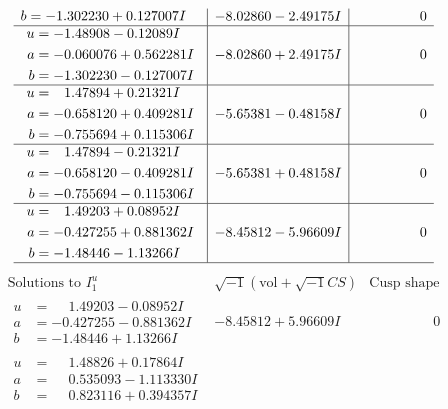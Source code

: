 \documentclass[1p]{elsarticle_modified}
\theoremstyle{definition}
\newcommand{\I}{\sqrt{-1}}
\begin{document}
$$\begin{array}{c|c|c}
\begin{aligned}
b &= -1.302230 + 0.127007 I\end{aligned}
 & -8.02860 - 2.49175 I & \phantom{-0.000000 } 0 \\ \hline\begin{aligned}
u &= -1.48908 - 0.12089 I \\
a &= -0.060076 + 0.562281 I \\
b &= -1.302230 - 0.127007 I\end{aligned}
 & -8.02860 + 2.49175 I & \phantom{-0.000000 } 0 \\ \hline\begin{aligned}
u &= \phantom{-}1.47894 + 0.21321 I \\
a &= -0.658120 + 0.409281 I \\
b &= -0.755694 + 0.115306 I\end{aligned}
 & -5.65381 - 0.48158 I & \phantom{-0.000000 } 0 \\ \hline\begin{aligned}
u &= \phantom{-}1.47894 - 0.21321 I \\
a &= -0.658120 - 0.409281 I \\
b &= -0.755694 - 0.115306 I\end{aligned}
 & -5.65381 + 0.48158 I & \phantom{-0.000000 } 0 \\ \hline\begin{aligned}
u &= \phantom{-}1.49203 + 0.08952 I \\
a &= -0.427255 + 0.881362 I \\
b &= -1.48446 - 1.13266 I\end{aligned}
 & -8.45812 - 5.96609 I & \phantom{-0.000000 } 0\\
 \hline 
 \end{array}$$\newpage$$\begin{array}{c|c|c}  
\text{Solutions to }I^u_{1}& \I (\text{vol} + \sqrt{-1}CS) & \text{Cusp shape}\\
 \hline 
\begin{aligned}
u &= \phantom{-}1.49203 - 0.08952 I \\
a &= -0.427255 - 0.881362 I \\
b &= -1.48446 + 1.13266 I\end{aligned}
 & -8.45812 + 5.96609 I & \phantom{-0.000000 } 0 \\ \hline\begin{aligned}
u &= \phantom{-}1.48826 + 0.17864 I \\
a &= \phantom{-}0.535093 - 1.113330 I \\
b &= \phantom{-}0.823116 + 0.394357 I\end{aligned}

\end{array}$$
\end{document}
